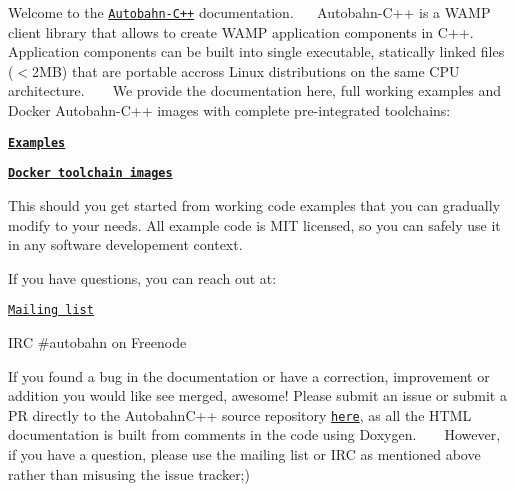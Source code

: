 Welcome to the \href{https://github.com/crossbario/autobahn-cpp}{\tt Autobahn-\/\+C++} documentation.~\newline
~\newline
 Autobahn-\/\+C++ is a W\+A\+MP client library that allows to create W\+A\+MP application components in C++. Application components can be built into single executable, statically linked files ($<$2\+MB) that are portable accross Linux distributions on the same C\+PU architecture. ~\newline
~\newline
 We provide the documentation here, full working examples and Docker Autobahn-\/\+C++ images with complete pre-\/integrated toolchains\+:


\begin{DoxyItemize}
\item {\bfseries \href{https://github.com/crossbario/autobahn-cpp/tree/master/examples}{\tt Examples}}
\item {\bfseries \href{https://hub.docker.com/r/crossbario/autobahn-cpp/}{\tt Docker toolchain images}}
\end{DoxyItemize}

This should you get started from working code examples that you can gradually modify to your needs. All example code is M\+IT licensed, so you can safely use it in any software developement context.

If you have questions, you can reach out at\+:


\begin{DoxyItemize}
\item \href{https://groups.google.com/forum/#!forum/autobahnws}{\tt Mailing list}
\item I\+RC \#autobahn on Freenode
\end{DoxyItemize}

If you found a bug in the documentation or have a correction, improvement or addition you would like see merged, awesome! Please submit an issue or submit a PR directly to the Autobahn\+C++ source repository \href{https://github.com/crossbario/autobahn-cpp}{\tt here}, as all the H\+T\+ML documentation is built from comments in the code using Doxygen. ~\newline
~\newline
 However, if you have a question, please use the mailing list or I\+RC as mentioned above rather than misusing the issue tracker;) 